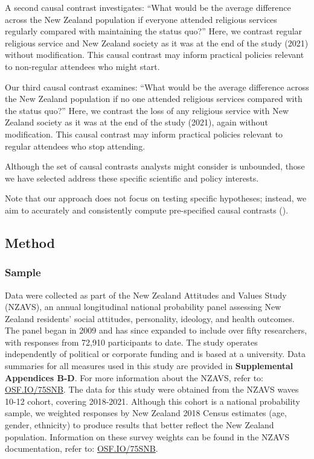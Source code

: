 \documentclass[
  single column]{article}
\begin{document}
A second causal contrast investigates: ``What would be the average
difference across the New Zealand population if everyone attended
religious services regularly compared with maintaining the status quo?''
Here, we contrast regular religious service and New Zealand society as
it was at the end of the study (2021) without modification. This causal
contrast may inform practical policies relevant to non-regular attendees
who might start.

Our third causal contrast examines: ``What would be the average
difference across the New Zealand population if no one attended
religious services compared with the status quo?'' Here, we contrast the
loss of any religious service with New Zealand society as it was at the
end of the study (2021), again without modification. This causal
contrast may inform practical policies relevant to regular attendees who
stop attending.

Although the set of causal contrasts analysts might consider is
unbounded, those we have selected address these specific scientific and
policy interests.

Note that our approach does not focus on testing specific hypotheses;
instead, we aim to accurately and consistently compute pre-specified
causal contrasts ().

\subsection{Method}\label{method}

\subsubsection{Sample}\label{sample}

Data were collected as part of the New Zealand Attitudes and Values
Study (NZAVS), an annual longitudinal national probability panel
assessing New Zealand residents' social attitudes, personality,
ideology, and health outcomes. The panel began in 2009 and has since
expanded to include over fifty researchers, with responses from 72,910
participants to date. The study operates independently of political or
corporate funding and is based at a university. Data summaries for all
measures used in this study are provided in \textbf{Supplemental
Appendices B-D}. For more information about the NZAVS, refer to:
\href{https://doi.org/10.17605/OSF.IO/75SNB}{OSF.IO/75SNB}. The data for
this study were obtained from the NZAVS waves 10-12 cohort, covering
2018-2021. Although this cohort is a national probability sample, we
weighted responses by New Zealand 2018 Census estimates (age, gender,
ethnicity) to produce results that better reflect the New Zealand
population. Information on these survey weights can be found in the
NZAVS documentation, refer to:
\href{https://doi.org/10.17605/OSF.IO/75SNB}{OSF.IO/75SNB}.
\end{document}
